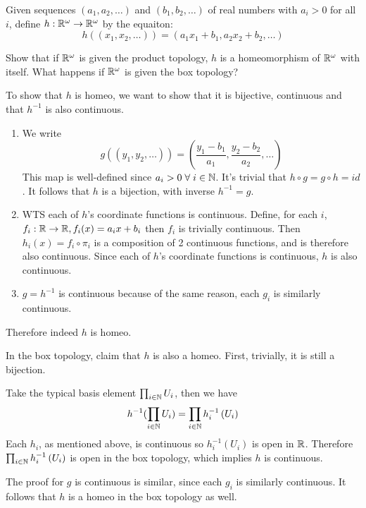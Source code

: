 \documentclass[a4paper, 12pt]{article}
\begin{document}
\begin{problem} 
    Given sequences $(a_1, a_2, \ldots)$ and $(b_1, b_2, \ldots)$ of real numbers with $a_i > 0$ for all $i$, define $h: \mathbb{R}^\omega \to \mathbb{R}^\omega$ by the equaiton:\begin{equation*}
    h((x_1, x_2, \ldots)) = (a_1 x_1 + b_1, a_2x_2 + b_2, \ldots)
    \end{equation*}

Show that if $\mathbb{R}^\omega$ is given the product topology, $h$ is a homeomorphism of $\mathbb{R}^\omega$ with itself. What happens if $\mathbb{R}^\omega$ is given the box topology?
\end{problem}
\begin{solution}
    To show that $h$ is homeo, we want to show that it is bijective, continuous and that $h^{-1}$ is also continuous.

    \begin{enumerate} [1.]
    \item We write \begin{equation*}
        g((y_1, y_2, \ldots)) = \left(\frac{y_1 - b_1}{a_1}, \frac{y_2 - b_2}{a_2}, \ldots\right)  
    \end{equation*}
    This map is well-defined since $a_i > 0 \forall i \in \bbn$. It's trivial that $h \circ g = g \circ h = id$. It follows that $h$ is a bijection, with inverse $h^{-1} = g$.
    \item WTS each of $h$'s coordinate functions is continuous. Define, for each $i$, $f_i: \mathbb{R} \to \mathbb{R}, f_i(x) = a_i x + b_i$ then $f_i$ is trivially continuous. Then $h_i(x) = f_i \circ \pi_i$ is a composition of 2 continuous functions, and is therefore also continuous. Since each of $h$'s coordinate functions is continuous, $h$ is also continuous.
    \item $g = h^{-1}$ is continuous because of the same reason, each $g_i$ is similarly continuous.
    \end{enumerate}
    Therefore indeed $h$ is homeo.

    In the box topology, claim that $h$ is also a homeo. First, trivially, it is still a bijection. 
    
    Take the typical basis element $\prod_{i \in \mathbb{N}} U_i$, then we have 
    \begin{equation*}
        h^{-1}(\prod_{i \in \mathbb{N}} U_i) = \prod_{i \in \mathbb{N}} h_i^{-1}\left(U_i\right) 
    \end{equation*}
    Each $h_i$, as mentioned above, is continuous so $h_i^{-1}(U_i)$ is open in $\mathbb{R}$. Therefore $\prod_{i \in \mathbb{N}} h_i^{-1}\left(U_i\right)$ is open in the box topology, which implies $h$ is continuous.

    The proof for $g$ is continuous is similar, since each $g_i$ is similarly continuous. It follows that $h$ is a homeo in the box topology as well.
\end{solution}
\end{document}
